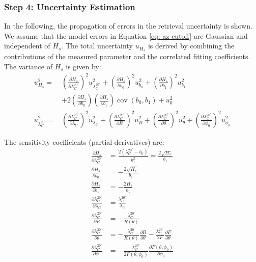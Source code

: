 \subsubsection{Step 4: Uncertainty Estimation}
\label{sec: Hs uncertainty}

In the following, the propagation of errors in the retrieval uncertainty is shown. We assume that the model errors in Equation \ref{eq: az cutoff} are Gaussian and independent of $H_{s}$. 
The total uncertainty $u_{H_s}$ is derived by combining the contributions of the measured parameter and the correlated fitting coefficients. The variance of $H_s$ is given by:
\begin{equation}
\begin{aligned}
    u_{H_s}^2 = & \left( \frac{\partial H_s}{\partial \lambda_C^{20^\circ}} \right)^2 u_{\lambda_C^{20^\circ}}^2 + \left( \frac{\partial H_s}{\partial b_0} \right)^2 u_{b_0}^2 + \left( \frac{\partial H_s}{\partial b_1} \right)^2 u_{b_1}^2 \\
    & + 2 \left( \frac{\partial H_s}{\partial b_0} \right) \left( \frac{\partial H_s}{\partial b_1} \right) \operatorname{cov}(b_0, b_1) + u_0^2 \\[15pt]
    u_{\lambda_C^{20^\circ}}^2 = & \left( \frac{\partial \lambda_C^{20^\circ}}{\partial \lambda_C} \right)^2 u_{\lambda_C}^2 + \left( \frac{\partial \lambda_C^{20^\circ}}{\partial R} \right)^2 u_R^2 + \left( \frac{\partial \lambda_C^{20^\circ}}{\partial \theta} \right)^2 u_\theta^2 + \left( \frac{\partial \lambda_C^{20^\circ}}{\partial \phi_0} \right)^2 u_{\phi_0}^2
\end{aligned}
\label{eq: errpro Hs}
\end{equation}

The sensitivity coefficients (partial derivatives) are:
\begin{equation}
\begin{aligned}
    \frac{\partial H_s}{\partial \lambda_C^{20^\circ}} &= \frac{2(\lambda_C^{20^\circ} - b_0)}{b_1^2} = \frac{2\sqrt{H_s}}{b_1} \\
    \frac{\partial H_s}{\partial b_0} &= -\frac{2\sqrt{H_s}}{b_1} \\
    \frac{\partial H_s}{\partial b_1} &= -\frac{2H_s}{b_1} \\
    \frac{\partial \lambda_C^{20^\circ}}{\partial \lambda_C} &= \frac{\lambda_C^{20^\circ}}{\lambda_C} \\ 
    \frac{\partial \lambda_C^{20^\circ}}{\partial R} &= -\frac{\lambda_C^{20^\circ}}{R(\theta)} \\ 
    \frac{\partial \lambda_C^{20^\circ}}{\partial \theta} &= -\frac{\lambda_C^{20^\circ}}{R(\theta)} \frac{\partial R}{\partial \theta} - \frac{\lambda_C^{20^\circ}}{2F} \frac{\partial F}{\partial \theta} \\
    \frac{\partial \lambda_C^{20^\circ}}{\partial \phi_0} &= -\frac{\lambda_C^{20^\circ}}{2F(\theta, \phi_0)} \frac{\partial F(\theta, \phi_0)}{\partial \phi_0}
\end{aligned}
\label{eq: parths}
\end{equation}

